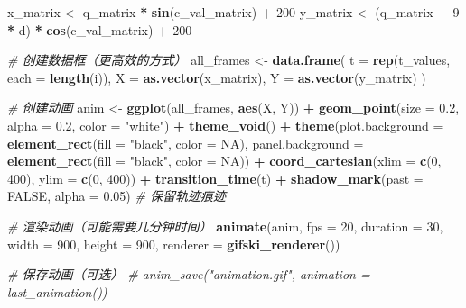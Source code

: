\documentclass[
]{book}
\newenvironment{Shaded}{\begin{snugshade}}{\end{snugshade}}
\newcommand{\AttributeTok}[1]{\textcolor[rgb]{0.13,0.29,0.53}{#1}}
\newcommand{\CommentTok}[1]{\textcolor[rgb]{0.56,0.35,0.01}{\textit{#1}}}
\newcommand{\ConstantTok}[1]{\textcolor[rgb]{0.56,0.35,0.01}{#1}}
\newcommand{\DecValTok}[1]{\textcolor[rgb]{0.00,0.00,0.81}{#1}}
\newcommand{\FloatTok}[1]{\textcolor[rgb]{0.00,0.00,0.81}{#1}}
\newcommand{\FunctionTok}[1]{\textcolor[rgb]{0.13,0.29,0.53}{\textbf{#1}}}
\newcommand{\NormalTok}[1]{#1}
\newcommand{\OtherTok}[1]{\textcolor[rgb]{0.56,0.35,0.01}{#1}}
\newcommand{\SpecialCharTok}[1]{\textcolor[rgb]{0.81,0.36,0.00}{\textbf{#1}}}
\newcommand{\StringTok}[1]{\textcolor[rgb]{0.31,0.60,0.02}{#1}}
\begin{document}
\begin{Shaded}
\begin{Highlighting}[]
\NormalTok{x\_matrix }\OtherTok{\textless{}{-}}\NormalTok{ q\_matrix }\SpecialCharTok{*} \FunctionTok{sin}\NormalTok{(c\_val\_matrix) }\SpecialCharTok{+} \DecValTok{200}
\NormalTok{y\_matrix }\OtherTok{\textless{}{-}}\NormalTok{ (q\_matrix }\SpecialCharTok{+} \DecValTok{9} \SpecialCharTok{*}\NormalTok{ d) }\SpecialCharTok{*} \FunctionTok{cos}\NormalTok{(c\_val\_matrix) }\SpecialCharTok{+} \DecValTok{200}

\CommentTok{\# 创建数据框（更高效的方式）}
\NormalTok{all\_frames }\OtherTok{\textless{}{-}} \FunctionTok{data.frame}\NormalTok{(}
  \AttributeTok{t =} \FunctionTok{rep}\NormalTok{(t\_values, }\AttributeTok{each =} \FunctionTok{length}\NormalTok{(i)),}
  \AttributeTok{X =} \FunctionTok{as.vector}\NormalTok{(x\_matrix),}
  \AttributeTok{Y =} \FunctionTok{as.vector}\NormalTok{(y\_matrix)}
\NormalTok{)}

\CommentTok{\# 创建动画}
\NormalTok{anim }\OtherTok{\textless{}{-}} \FunctionTok{ggplot}\NormalTok{(all\_frames, }\FunctionTok{aes}\NormalTok{(X, Y)) }\SpecialCharTok{+}
  \FunctionTok{geom\_point}\NormalTok{(}\AttributeTok{size =} \FloatTok{0.2}\NormalTok{, }\AttributeTok{alpha =} \FloatTok{0.2}\NormalTok{, }\AttributeTok{color =} \StringTok{"white"}\NormalTok{) }\SpecialCharTok{+}
  \FunctionTok{theme\_void}\NormalTok{() }\SpecialCharTok{+}
  \FunctionTok{theme}\NormalTok{(}\AttributeTok{plot.background =} \FunctionTok{element\_rect}\NormalTok{(}\AttributeTok{fill =} \StringTok{"black"}\NormalTok{, }\AttributeTok{color =} \ConstantTok{NA}\NormalTok{),}
        \AttributeTok{panel.background =} \FunctionTok{element\_rect}\NormalTok{(}\AttributeTok{fill =} \StringTok{"black"}\NormalTok{, }\AttributeTok{color =} \ConstantTok{NA}\NormalTok{)) }\SpecialCharTok{+}
  \FunctionTok{coord\_cartesian}\NormalTok{(}\AttributeTok{xlim =} \FunctionTok{c}\NormalTok{(}\DecValTok{0}\NormalTok{, }\DecValTok{400}\NormalTok{), }\AttributeTok{ylim =} \FunctionTok{c}\NormalTok{(}\DecValTok{0}\NormalTok{, }\DecValTok{400}\NormalTok{)) }\SpecialCharTok{+}
  \FunctionTok{transition\_time}\NormalTok{(t) }\SpecialCharTok{+}
  \FunctionTok{shadow\_mark}\NormalTok{(}\AttributeTok{past =} \ConstantTok{FALSE}\NormalTok{, }\AttributeTok{alpha =} \FloatTok{0.05}\NormalTok{)  }\CommentTok{\# 保留轨迹痕迹}

\CommentTok{\# 渲染动画（可能需要几分钟时间）}
\FunctionTok{animate}\NormalTok{(anim, }
        \AttributeTok{fps =} \DecValTok{20}\NormalTok{, }
        \AttributeTok{duration =} \DecValTok{30}\NormalTok{, }
        \AttributeTok{width =} \DecValTok{900}\NormalTok{, }
        \AttributeTok{height =} \DecValTok{900}\NormalTok{,}
        \AttributeTok{renderer =} \FunctionTok{gifski\_renderer}\NormalTok{())}

\CommentTok{\# 保存动画（可选）}
\CommentTok{\# anim\_save("animation.gif", animation = last\_animation())}
\end{Highlighting}
\end{Shaded}
\end{document}
